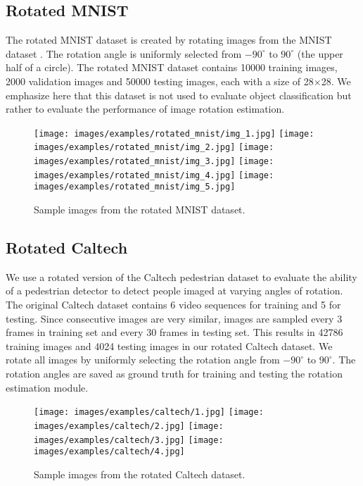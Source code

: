 \documentclass[10pt,twocolumn,letterpaper]{article}
\begin{document}
\subsection{Rotated MNIST}

The rotated MNIST dataset is created by rotating images from the MNIST dataset \cite{Liu2003}. The rotation angle is uniformly selected from $-90^{\circ}$ to $90^{\circ}$ (the upper half of a circle). The rotated MNIST dataset contains 10000 training images, 2000 validation images and 50000 testing images, each with a size of 28$ \times $28. We emphasize here that this dataset is not used to evaluate object classification but rather to evaluate the performance of image rotation estimation.

\vspace{-0.2cm}
\begin{figure}[!h]
    \centering
    \texttt{[image: images/examples/rotated\_mnist/img\_1.jpg]}
    \texttt{[image: images/examples/rotated\_mnist/img\_2.jpg]}
    \texttt{[image: images/examples/rotated\_mnist/img\_3.jpg]}
    \texttt{[image: images/examples/rotated\_mnist/img\_4.jpg]}
    \texttt{[image: images/examples/rotated\_mnist/img\_5.jpg]}
    \caption{Sample images from the rotated MNIST dataset.}
    \label{fig:rotated_mnist_illustration}
    \vspace{-4mm}
\end{figure}


\subsection{Rotated Caltech} \label{sec:rot_caltech}

We use a rotated version of the Caltech pedestrian dataset to evaluate the ability of a pedestrian detector to detect people imaged at varying angles of rotation. The original Caltech dataset contains 6 video sequences for training and 5 for testing. Since consecutive images are very similar, images are sampled every 3 frames in training set and every 30 frames in testing set. This results in 42786 training images and 4024 testing images in our rotated Caltech dataset. We rotate all images by uniformly selecting the rotation angle from $-90^{\circ}$ to $90^{\circ}$. The rotation angles are saved as ground truth for training and testing the rotation estimation module.

\vspace{-0.2cm}
\begin{figure}[!h]
    \centering
    \texttt{[image: images/examples/caltech/1.jpg]}
    \texttt{[image: images/examples/caltech/2.jpg]}
    \texttt{[image: images/examples/caltech/3.jpg]}
    \texttt{[image: images/examples/caltech/4.jpg]}
    \caption{Sample images from the rotated Caltech dataset.}
    \label{fig:rotated_caltech_illustration}
    \vspace{-0.4cm}
\end{figure}
\end{document}

